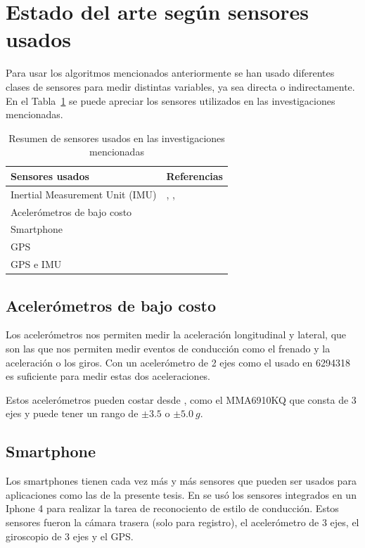 \section{Estado del arte según sensores usados}

Para usar los algoritmos mencionados anteriormente se han usado diferentes clases de sensores para medir distintas variables, ya sea directa o indirectamente. En el Tabla~\ref{diag:2.3} se puede apreciar los sensores utilizados en las investigaciones mencionadas.

\begin{table}[htpb!]
\centering
\caption{Resumen de sensores usados en las investigaciones mencionadas}
\begin{tabular}{@{}ll@{}}
\toprule
Sensores usados & Referencias \\ \midrule
Inertial Measurement Unit (IMU)& \cite{4938719}, \cite{7727682}, \cite{6629603} \\
Acelerómetros de bajo costo & \cite{6294318} \\
Smartphone & \cite{6083078} \\
GPS & \cite{constantinescu} \\
GPS e IMU & \cite{6957822} \\ \bottomrule
\end{tabular}
\label{diag:2.3}
\end{table}

\subsection{Acelerómetros de bajo costo}
Los acelerómetros nos permiten medir la aceleración longitudinal y lateral, que son las que nos permiten medir eventos de conducción como el frenado y la aceleración o los giros. Con un acelerómetro de 2 ejes como el usado en {6294318} es suficiente para medir estas dos aceleraciones.

Estos acelerómetros pueden costar desde , como el MMA6910KQ \cite{acelerom} que consta de 3 ejes y puede tener un rango de $\pm 3.5$ o $\pm \SI{5.0}{g} $.

\subsection{Smartphone}
Los smartphones tienen cada vez más y más sensores que pueden ser usados para aplicaciones como las de la presente tesis. En \cite{6083078} se usó los sensores integrados en un Iphone 4 para realizar la tarea de reconociento de estilo de conducción. Estos sensores fueron la cámara trasera (solo para registro), el acelerómetro de 3 ejes, el giroscopio de 3 ejes y el GPS.

